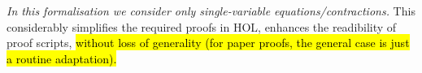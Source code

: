 
\emph{In this
formalisation we consider only single-variable equations/contractions.}
This considerably
 simplifies the required proofs in HOL, enhances the readibility of
 proof scripts, \hl{without loss of generality (for paper proofs, the
 general case is just a routine
 adaptation).}




